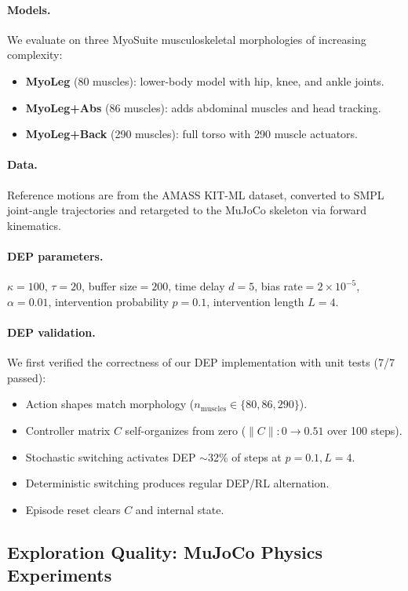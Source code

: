 \documentclass[10pt,twocolumn]{article}
\begin{document}
\paragraph{Models.} We evaluate on three MyoSuite musculoskeletal morphologies of increasing complexity:
\begin{itemize}[nosep, leftmargin=*]
\item \textbf{MyoLeg} (80 muscles): lower-body model with hip, knee, and ankle joints.
\item \textbf{MyoLeg+Abs} (86 muscles): adds abdominal muscles and head tracking.
\item \textbf{MyoLeg+Back} (290 muscles): full torso with 290 muscle actuators.
\end{itemize}

\paragraph{Data.} Reference motions are from the AMASS KIT-ML dataset, converted to SMPL joint-angle trajectories and retargeted to the MuJoCo skeleton via forward kinematics.

\paragraph{DEP parameters.} $\kappa=100$, $\tau=20$, buffer size$=200$, time delay $d=5$, bias rate$=2\times10^{-5}$, $\alpha=0.01$, intervention probability $p=0.1$, intervention length $L=4$.

\paragraph{DEP validation.} We first verified the correctness of our DEP implementation with unit tests (7/7 passed):
\begin{itemize}[nosep, leftmargin=*]
\item Action shapes match morphology ($n_\text{muscles} \in \{80, 86, 290\}$).
\item Controller matrix $C$ self-organizes from zero ($\|C\|: 0 \to 0.51$ over 100 steps).
\item Stochastic switching activates DEP $\sim$32\% of steps at $p=0.1, L=4$.
\item Deterministic switching produces regular DEP/RL alternation.
\item Episode reset clears $C$ and internal state.
\end{itemize}

\subsection{Exploration Quality: MuJoCo Physics Experiments}
\end{document}

